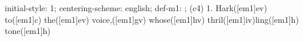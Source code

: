 initial-style: 1;
centering-scheme: english;
def-m1: \grealign;
(c4) 1. Hark([em1]ev) to([em1]c) the([em1]ev) voice,([em1]gv) whose([em1]hv) thril([em1]iv)ling([em1]h) tone([em1]h)